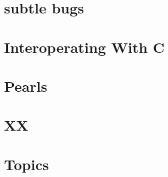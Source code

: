 \documentclass[svgnames,12pt,a4paper]{book}
\begin{document}
\chapter{subtle bugs}
\label{sec:subtle-bugs}





\chapter{Interoperating With C}
\label{sec:inter-with-c}


\chapter{Pearls}





\chapter{XX}


\chapter{Topics}




\end{document}
